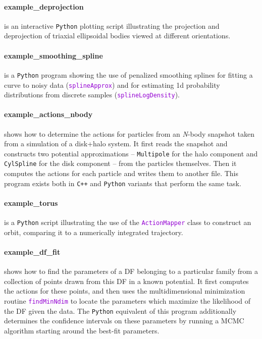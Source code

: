 \documentclass[12pt]{article}
\newcommand{\Nbody}{\textsl{N}-body\xspace}
\newcommand{\Cpp}  {\texttt{C++}\xspace}
\newcommand{\Python}{\texttt{Python}\xspace}
\newcommand{\ttt}[1]{\textcolor{darkviolet}{\texttt{#1}}}
\newcommand{\ppp}[1]{\textcolor{darkolive} {\texttt{#1}}}
\let\oldparagraph\paragraph
\renewcommand{\paragraph}[1]{\vspace{-2mm}\oldparagraph{#1}}
\begin{document}
\paragraph{example_deprojection} is an interactive \Python plotting script illustrating the projection and deprojection of triaxial ellipsoidal bodies viewed at different orientations.

\paragraph{example_smoothing_spline} is a \Python program showing the use of penalized smoothing splines for fitting a curve to noisy data (\ttt{splineApprox}) and for estimating 1d probability distributions from discrete samples (\ttt{splineLogDensity}).

\paragraph{example_actions_nbody} shows how to determine the actions for particles from an \Nbody snapshot taken from a simulation of a disk+halo system. It first reads the snapshot and constructs two potential approximations -- \ppp{Multipole} for the halo component and \ppp{CylSpline} for the disk component -- from the particles themselves. Then it computes the actions for each particle and writes them to another file. This program exists both in \Cpp and \Python variants that perform the same task.

\paragraph{example_torus} is a \Python script illustrating the use of the \ttt{ActionMapper} class to construct an orbit, comparing it to a numerically integrated trajectory.

\paragraph{example_df_fit} shows how to find the parameters of a DF belonging to a particular family from a collection of points drawn from this DF in a known potential. It first computes the actions for these points, and then uses the multidimensional minimization routine \ttt{findMinNdim} to locate the parameters which maximize the likelihood of the DF given the data.
The \Python equivalent of this program additionally determines the confidence intervals on these parameters by running a MCMC algorithm starting around the best-fit parameters.
\end{document}
